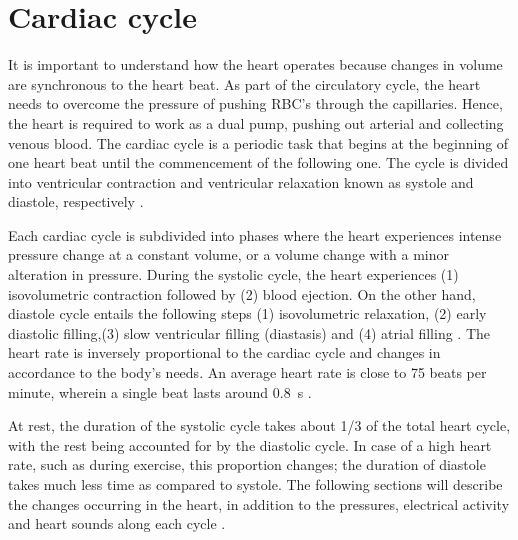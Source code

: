 \section{Cardiac cycle}
\label{background cardiac cycle}
It is important to understand how the heart operates because changes in volume are synchronous to the heart beat. As part of the circulatory cycle, the heart needs to overcome the pressure of pushing RBC's through the capillaries. Hence, the heart is required to work as a dual pump, pushing out arterial and collecting venous blood. The cardiac cycle is a periodic task that begins at the beginning of one heart beat until the commencement of the following one. The cycle is divided into ventricular contraction and ventricular relaxation known as systole and diastole, respectively \cite{Weinhaus2015}. 

Each cardiac cycle is subdivided into phases where the heart experiences intense pressure change at a constant volume, or a volume change with a minor alteration in pressure. During the systolic cycle, the heart experiences (1) isovolumetric contraction followed by (2) blood ejection. On the other hand, diastole cycle entails the following steps (1) isovolumetric relaxation, (2) early diastolic filling,(3) slow ventricular filling (diastasis) and (4) atrial filling \cite{fukuta2008cardiac}. The heart rate is inversely proportional to the cardiac cycle and changes in accordance to the body's needs. An average heart rate is close to 75 beats per minute, wherein a single beat lasts around \SI{0.8}{\second} \cite{Hall:2015aa}.

At rest, the duration of the systolic cycle takes about 1/3 of the total heart cycle, with the rest being accounted for by the diastolic cycle. In case of a high heart rate, such as during exercise, this proportion changes; the duration of diastole takes much less time as compared to systole. The following sections will describe the changes occurring in the heart, in addition to the pressures, electrical activity and heart sounds along each cycle \cite{Hall:2015aa}.

